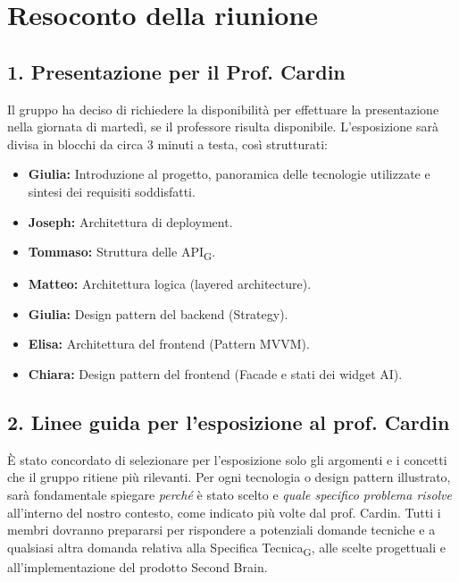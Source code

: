 \documentclass[a4paper,12pt]{article}
\newcommand{\gls}[1]{#1\textsubscript{G}}
\begin{document}
\section*{Resoconto della riunione}

\subsection*{1. Presentazione per il Prof. Cardin}
Il gruppo ha deciso di richiedere la disponibilità per effettuare la presentazione nella giornata di martedì, se il professore risulta disponibile. L'esposizione sarà divisa in blocchi da circa 3 minuti a testa, così strutturati:
\begin{itemize}
    \item \textbf{Giulia:} Introduzione al progetto, panoramica delle tecnologie utilizzate e sintesi dei requisiti soddisfatti.
    \item \textbf{Joseph:} Architettura di deployment.
    \item \textbf{Tommaso:} Struttura delle \gls{API}.
    \item \textbf{Matteo:} Architettura logica (layered architecture).
    \item \textbf{Giulia:} Design pattern del backend (Strategy).
    \item \textbf{Elisa:} Architettura del frontend (Pattern MVVM).
    \item \textbf{Chiara:} Design pattern del frontend (Facade e stati dei widget AI).
\end{itemize}

\subsection*{2. Linee guida per l'esposizione al prof. Cardin}
È stato concordato di selezionare per l'esposizione solo gli argomenti e i concetti che il gruppo ritiene più rilevanti. Per ogni tecnologia o design pattern illustrato, sarà fondamentale spiegare \textit{perché} è stato scelto e \textit{quale specifico problema risolve} all'interno del nostro contesto, come indicato più volte dal prof. Cardin.
Tutti i membri dovranno prepararsi per rispondere a potenziali domande tecniche e a qualsiasi altra domanda relativa alla \gls{Specifica Tecnica}, alle scelte progettuali e all'implementazione del prodotto Second Brain.
\end{document}
